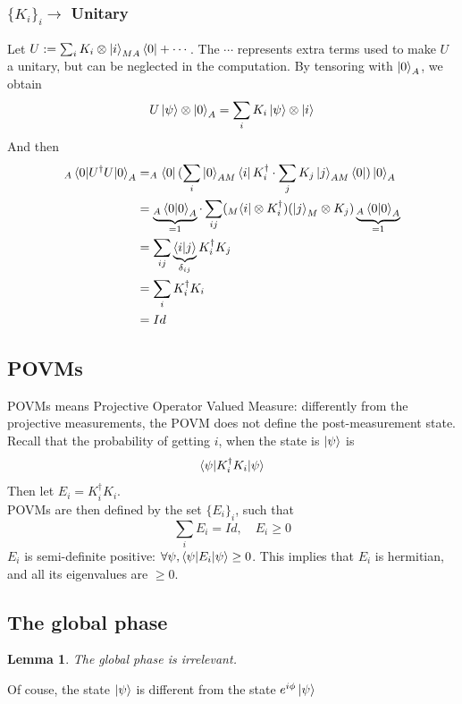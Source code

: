 \documentclass{article}
\newtheorem{lemma}{Lemma}
\begin{document}
\subsubsection*{$\{K_i\}_i \rightarrow$ Unitary} Let $U := \sum_i K_i \otimes
\ket{i}_{MA}\bra{0} + \cdots $. The $\cdots$ represents extra terms used to make
$U$ a unitary, but can be neglected in the computation. By tensoring with
$\ket{0}_A$, we obtain
\begin{equation}
    U\ket{\psi}\otimes \ket{0}_A = \sum_i K_i \ket{\psi}\otimes\ket{i}
\end{equation}
And then
\begin{equation}
    \begin{aligned}
        _A\braket{0 |U^\dagger U|0}_A
            & = _A\bra{0}(\sum_i\ket{0}_{AM}\bra{i} K_i^\dagger \cdot \sum_j
            K_j\ket{j}_{AM}\bra{0})\ket{0}_A \\
            & = \underbrace{_A\braket{0|0}_A}_{=1} \cdot \sum_{ij}(_M\bra{i}\otimes
            K_i^\dagger)(\ket{j}_M\otimes K_j) \underbrace{_A\braket{0|0}_A}_{=1} \\
            & = \sum_{ij}\underbrace{\braket{i|j}}_{\delta_{ij}} K_i^\dagger K_j \\
            & = \sum_i K_i^\dagger K_i \\
            & = Id
    \end{aligned}
\end{equation}
\subsection{POVMs}
POVMs means Projective Operator Valued Measure: differently from the projective
measurements, the POVM does not define the post-measurement state.\\
Recall that the probability of getting $i$, when the state is $\ket{\psi}$ is
\begin{equation}
\braket{\psi | K_i^\dagger K_i | \psi}
\end{equation}
Then let $E_i = K_i^\dagger K_i$.\\\noindent POVMs are then defined by the set
$\{E_i\}_i$, such that
\begin{equation}
\sum_i E_i = Id, \quad E_i\geq 0
\end{equation}
$E_i$ is semi-definite positive: $ \forall \psi, \braket{\psi|E_i|\psi} \geq 0$.
This implies that $E_i$ is hermitian, and all its eigenvalues are $\geq 0$.

\subsection{The global phase}\label{global-phase}
\begin{lemma}
The global phase is irrelevant.
\end{lemma}
Of couse, the state $\ket{\psi}$ is different from the state
$e^{i\phi}\ket{\psi}$
\end{document}
